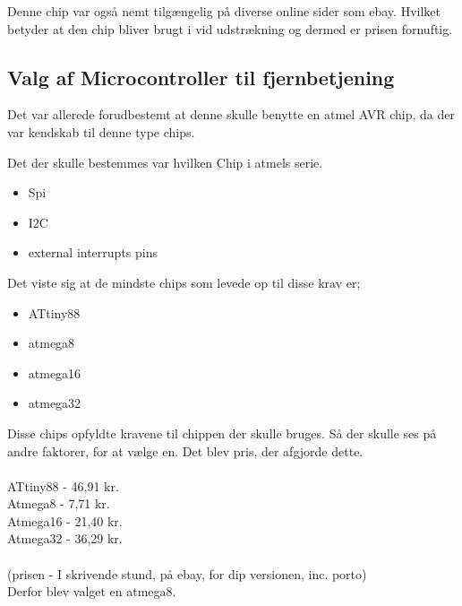 \documentclass[Main]{subfiles}
\begin{document}
Denne chip var også nemt tilgængelig på diverse online sider som ebay. Hvilket betyder at den chip bliver brugt i vid udstrækning og dermed er prisen fornuftig.
\\
\subsection{Valg af Microcontroller til fjernbetjening}

Det var allerede forudbestemt at denne skulle benytte en atmel AVR chip, da der var kendskab til denne type chips.

Det der skulle bestemmes var hvilken Chip i atmels serie.

\begin{itemize}
\item Spi
\item I2C
\item external interrupts pins
\end{itemize}

Det viste sig at de mindste chips som levede op til disse krav er;

\begin{itemize}
\item ATtiny88	\cite{AtmelTiny}
\item atmega8	\cite{AtmelMega8}
\item atmega16	\cite{AtmelMega16}
\item atmega32  \cite{AtmelMega32}
\end{itemize}


Disse chips opfyldte kravene til chippen der skulle bruges.
Så der skulle ses på andre faktorer, for at vælge en. 
Det blev pris, der afgjorde dette.\\\\
ATtiny88 - 46,91 kr.\\
Atmega8  - 7,71 kr.\\
Atmega16 - 21,40 kr.\\
Atmega32 - 36,29 kr.\\
\\(prisen - I skrivende stund, på ebay, for dip versionen, inc. porto)
\\Derfor blev valget en atmega8.
\end{document}
